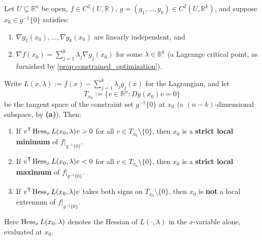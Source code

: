 \begin{theorem}
\label{thm:second_order_lagrange_test}
Let $U \subseteq \mathbb{R}^n$ be open, $f \in C^2(U,\mathbb{R})$, $g = (g_1,\dots,g_k) \in
C^2(U,\mathbb{R}^k)$, and suppose $x_0 \in g^{-1}\{0\}$ satisfies:
\begin{enumerate}[label=\textbf{(\alph*)}]
  \item $\nabla g_1(x_0),\dots,\nabla g_k(x_0)$ are linearly independent, and
  \item $\nabla f(x_0) = \sum_{j=1}^k\lambda_j\nabla g_j(x_0)$ for some $\lambda \in
    \mathbb{R}^k$ (a Lagrange critical point, as furnished by
    \cref{prop:constrained_optimization}).
\end{enumerate}
Write $L(x,\lambda) := f(x) - \sum_{j=1}^k\lambda_jg_j(x)$ for the Lagrangian, and let
\[T_{x_0} := \{v \in \mathbb{R}^n : Dg(x_0)v = 0\}\]
be the tangent space of the constraint set $g^{-1}\{0\}$ at $x_0$ (a $(n-k)$-dimensional
subspace, by \textbf{(a)}). Then:
\begin{enumerate}[label=\textbf{(\alph*)}]
  \item If $v^{\mathsf{T}}\operatorname{Hess}_xL(x_0,\lambda)v > 0$ for all $v \in T_{x_0}\setminus\{0\}$, then
    $x_0$ is a \textbf{strict local minimum} of $f|_{g^{-1}\{0\}}$.
  \item If $v^{\mathsf{T}}\operatorname{Hess}_xL(x_0,\lambda)v < 0$ for all $v \in T_{x_0}\setminus\{0\}$, then
    $x_0$ is a \textbf{strict local maximum} of $f|_{g^{-1}\{0\}}$.
  \item If $v^{\mathsf{T}}\operatorname{Hess}_xL(x_0,\lambda)v$ takes both signs on $T_{x_0}\setminus\{0\}$, then
    $x_0$ is \textbf{not} a local extremum of $f|_{g^{-1}\{0\}}$.
\end{enumerate}
Here $\operatorname{Hess}_xL(x_0,\lambda)$ denotes the Hessian of $L(\cdot,\lambda)$ in the $x$-variable
alone, evaluated at $x_0$.
\end{theorem}

